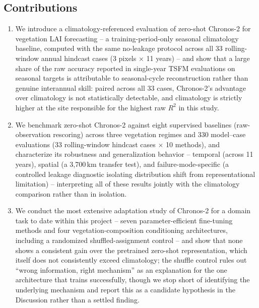 \documentclass[11pt]{article}
\begin{document}
\subsection{Contributions}
\label{sec:contributions}

\begin{enumerate}
  \item We introduce a climatology-referenced evaluation of zero-shot Chronos-2 for vegetation LAI
    forecasting -- a training-period-only seasonal climatology baseline, computed with the same
    no-leakage protocol across all 33 rolling-window annual hindcast cases (3 pixels $\times$ 11
    years) -- and show that a large share of the raw accuracy reported in single-year TSFM
    evaluations on seasonal targets is attributable to seasonal-cycle reconstruction rather than
    genuine interannual skill: paired across all 33 cases, Chronos-2's advantage over climatology
    is not statistically detectable, and climatology is strictly higher at the site responsible
    for the highest raw $R^2$ in this study.
  \item We benchmark zero-shot Chronos-2 against eight supervised baselines (raw-observation
    rescoring) across three vegetation regimes and 330 model--case evaluations (33 rolling-window
    hindcast cases $\times$ 10 methods),
    and characterize its robustness and generalization behavior -- temporal (across 11 years),
    spatial (a 3{,}700\,km transfer test), and failure-mode-specific (a controlled leakage
    diagnostic isolating distribution shift from representational limitation) -- interpreting all
    of these results jointly with the climatology comparison rather than in isolation.
  \item We conduct the most extensive adaptation study of Chronos-2 for a domain task to date
    within this project -- seven parameter-efficient fine-tuning methods and four
    vegetation-composition conditioning architectures, including a randomized shuffled-assignment
    control -- and show that none shows a consistent gain over the pretrained zero-shot
    representation, which itself does not consistently exceed climatology; the shuffle control
    rules out ``wrong information, right mechanism'' as an explanation for the one architecture
    that trains successfully, though we stop short of identifying the underlying mechanism and
    report this as a candidate hypothesis in the Discussion rather than a settled finding.
\end{enumerate}

\end{document}
